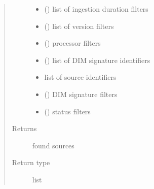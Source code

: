 \begin{fulllineitems}
\begin{fulllineitems}
\begin{quote}
\begin{description}
\begin{itemize}
\item {} 
 () \textendash{} list of ingestion duration filters

\item {} 
 () \textendash{} list of version filters

\item {} 
 () \textendash{} processor filters

\item {} 
 () \textendash{} list of DIM signature identifiers

\item {} 
 \textendash{} list of source identifiers

\item {} 
 () \textendash{} DIM signature filters

\item {} 
 () \textendash{} status filters

\end{itemize}

\item[{Returns}] \leavevmode
found sources

\item[{Return type}] \leavevmode
list

\end{description}\end{quote}

\end{fulllineitems}


\begin{fulllineitems}
\label{\detokenize{eboa.engine:eboa.engine.query.Query.prepare_query_values}}
\end{fulllineitems}


\end{fulllineitems}

